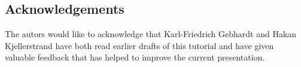 \subsection*{Acknowledgements}
The autors would like to acknowledge that Karl-Friedrich Gebhardt and Hakan Kjellerstrand 
have both  read earlier drafts of
this tutorial and have given valuable feedback that has helped to improve the current
presentation. 

